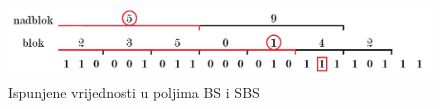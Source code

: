 \begin{figure}[H]
\centering
\includegraphics[width=\linewidth]{./pictures/rrr2.png}
\caption{Ispunjene vrijednosti u poljima BS i SBS}\label{rrr2}
\end{figure}
























